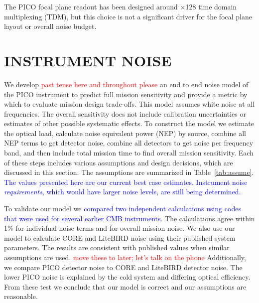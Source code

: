 \documentclass[]{spie}  %
\newcommand{\comr}[1]{\textcolor{red}{#1}}
\newcommand{\comb}[1]{\textcolor{blue}{#1}}
\begin{document}
The PICO focal plane readout has been designed around $\times$128 time domain multiplexing (TDM), but this choice is not a 
significant driver for the focal plane layout or overall noise budget. 

\section{INSTRUMENT NOISE}
\label{sec:noise}

We develop \comr{past tense here and throughout please} an end to end noise model of the PICO instrument to predict full mission sensitivity and 
provide a metric by which to evaluate mission design trade-offs.  This model assumes white noise
at all frequencies. The overall sensitivity does not include calibration uncertainties or estimates of other possible 
systematic effects. To construct the model we estimate the 
optical load, calculate noise equivalent power (NEP) by source, 
combine all NEP terms to get detector noise, combine all detectors to get noise per frequency band, and then 
include total mission time to find overall mission sensitivity.\cite{suzuki2013_thesis,aubin2013_thesis}  
Each of these steps includes various assumptions and design decisions, 
which are discussed in this section.  The assumptions are summarized in Table~\ref{tab:assume}.
\comb{The values presented here are our current best case estimates. Instrument noise {\it requirements}, which would have larger 
noise levels, are still being determined.}

To validate our model we \comb{compared two independent calculations using codes that were used for several earlier
CMB instruments}.  The calculations agree within 1\% for individual noise terms 
and for overall mission noise.  We also use our model to calculate CORE and LiteBIRD noise using their published system parameters. The 
results are consistent with published values when similar assumptions are used.  \comr{move these to later; let's talk on the phone} Additionally, 
we compare PICO detector noise to CORE and LiteBIRD detector noise.  The lower PICO noise is explained by the cold system and differing 
optical efficiency.  From these test we conclude that our model is correct and our assumptions are reasonable.
\end{document}
